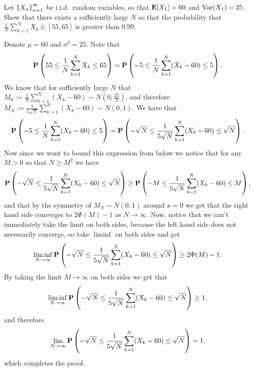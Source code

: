 \documentclass[11pt,a4paper]{article}
\begin{document}
\begin{exercise}
  Let $\left\{X_n\right\}_{n=1}^{\infty}$ be i.i.d.\ random variables,
  so that $\mathbf{E}[X_1] = 60$ and $\operatorname{Var}(X_1) = 25$.
  Show that there exists a sufficiently large $N$
  so that the probability that $\frac{1}{N} \sum_{k=1}^{N} X_k \in [55,65]$
  is greater than $0.99$.
\end{exercise}
\begin{solution}
  Denote $\mu = 60$ and $\sigma^2 = 25$.
  Note that
  \begin{align*}
    \Prob\del{55 \le \frac{1}{N} \sum_{k=1}^{N} X_k \le 65} =
    \Prob\del{-5 \le \frac{1}{N} \sum_{k=1}^{N} (X_k - 60) \le 5}.
  \end{align*}
  We know that for sufficiently large $N$
  that $M_0 := \frac{1}{N} \sum_{k=1}^{N} (X_k - 60) \sim N(0,\frac{25}{N})$,
  and therefore $M_N := \frac{1}{5\sqrt{N}} \sum_{k=1}^{N} (X_k - 60) \sim
  N(0,1)$.
  We have that
  \[
    \Prob\del{-5 \le \frac{1}{N} \sum_{k=1}^{N} (X_k - 60) \le 5} =
    \Prob\del{-\sqrt{N} \le \frac{1}{5\sqrt{N}} \sum_{k=1}^{N} (X_k - 60) \le \sqrt{N}}.
  \]
  Now since we want to bound this expression
  from below we notice that for any $M > 0$ so that $N \geq M^2$ we have
  \[
    \Prob\del{-\sqrt{N} \le \frac{1}{5\sqrt{N}} \sum_{k=1}^{N} (X_k - 60) \le \sqrt{N}} \geq
    \Prob\del{-M \le \frac{1}{5\sqrt{N}} \sum_{k=1}^{N} (X_k - 60) \le M},
  \]
  and that by the symmetry of $M_N \sim N(0,1)$ around $x = 0$
  we get that the right hand side converges to $2\Phi(M) - 1$
  as $N \to \infty$.
  Now, notice that we can't immediately take the limit on both sides,
  because the left hand side does not necessarily converge,
  so take $\liminf$ on both sides and get
  \[
    \liminf_{N \to \infty} \Prob\del{-\sqrt{N} \le \frac{1}{5\sqrt{N}} \sum_{k=1}^{N} (X_k - 60) \le \sqrt{N}} \geq
    2\Phi(M) - 1.
  \]
  By taking the limit $M \to \infty$ on both sides we get that
  \[
    \liminf_{N \to \infty} \Prob\del{-\sqrt{N} \le \frac{1}{5\sqrt{N}} \sum_{k=1}^{N} (X_k - 60) \le \sqrt{N}} \geq
    1,
  \]
  and therefore 
  \[
    \lim_{N \to \infty} \Prob\del{-\sqrt{N} \le \frac{1}{5\sqrt{N}} \sum_{k=1}^{N} (X_k - 60) \le \sqrt{N}}
    = 1,
  \]
  which completes the proof.
\end{solution}
\end{document}
